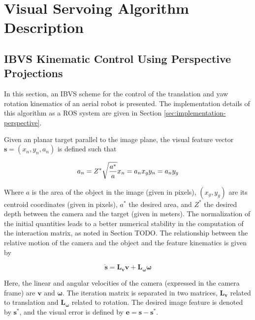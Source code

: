 
\chapter{Visual Servoing Algorithm Description}
\label{chap:algorithm-drescription}

\section{IBVS Kinematic Control Using Perspective Projections}

In this section, an IBVS scheme for the control of the translation and yaw rotation kinematics \cite{bourquardez_2009} of an aerial robot is presented. The implementation details of this algorithm as a ROS system are given in Section \ref{sec:implementation-perspective}. 

Given an planar target parallel to the image plane, the visual feature vector $\bm{s} = (x_n, y_n, a_n)$ is defined such that

\begin{equation*}
a_n = Z^\ast \sqrt{\frac{a^\ast}{a}} \\
x_n = a_n x_g \\
 y_n = a_n y_g 
\end{equation*}

Where $a$ is the area of the object in the image (given in pixels), $\left( x_g , y_g \right) $ are its centroid coordinates (given in pixels), $a^\ast$ the desired area, and $Z^\ast$ the desired depth between the camera and the target (given in meters). The normalization of the initial quantities leads to a better numerical stability in the computation of the interaction matrix, as noted in Section TODO. The relationship between the relative motion of the camera and the object and the feature kinematics is given by

\begin{equation}
\dot{\bm{s}} = \bm{L_v} \bm{v} + \bm{L_\omega} \bm{\omega}
\end{equation}

Here, the linear and angular velocities of the camera (expressed in the camera frame) are $\bm{v}$ and $\bm{\omega}$. The iteration matrix is separated in two matrices, $\bm{L_v}$ related to translation and $\bm{L_\omega}$ related to rotation. The desired image feature is denoted by $\bm{s}^\ast$, and the visual error is defined by $\bm{e} = \bm{s} - \bm{s}^\ast$.

